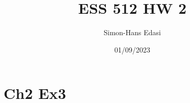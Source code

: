\documentclass{article}
\title{ESS 512 HW 2}
\date{01/09/2023}
\author{Simon-Hans Edasi}
\begin{document}
	\maketitle



\section{Ch2 Ex3}
\end{document}

